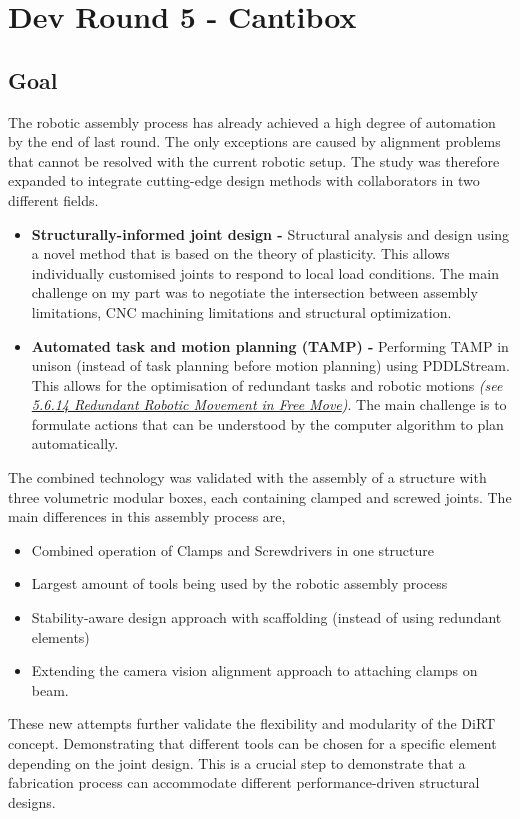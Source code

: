 \chapter{Dev Round 5 - Cantibox}

\section{Goal}

The robotic assembly process has already achieved a high degree of automation by the end of last round. The only exceptions are caused by alignment problems that cannot be resolved with the current robotic setup. The study was therefore expanded to integrate cutting-edge design methods with collaborators in two different fields. 

\begin{itemize}
	\item \textbf{Structurally-informed joint design -} Structural analysis and design using a novel method that is based on the theory of plasticity. This allows individually customised joints to respond to local load conditions. The main challenge on my part was to negotiate the intersection between assembly limitations, CNC machining limitations and structural optimization. 

	\item \textbf{Automated task and motion planning (TAMP) -} Performing TAMP in unison (instead of task planning before motion planning) using PDDLStream. This allows for the optimisation of redundant tasks and robotic motions \textit{(see \uline{5.6.14 Redundant Robotic Movement in Free Move})}. The main challenge is to formulate actions that can be understood by the computer algorithm to plan automatically. 

\end{itemize}
The combined technology was validated with the assembly of a structure with three volumetric modular boxes, each containing clamped and screwed joints. The main differences in this assembly process are,

\begin{itemize}
	\item Combined operation of Clamps and Screwdrivers in one structure

	\item Largest amount of tools being used by the robotic assembly process

	\item Stability-aware design approach with scaffolding (instead of using redundant elements)

	\item Extending the camera vision alignment approach to attaching clamps on beam.

\end{itemize}
These new attempts further validate the flexibility and modularity of the DiRT concept. Demonstrating that different tools can be chosen for a specific element depending on the joint design. This is a crucial step to demonstrate that a fabrication process can accommodate different performance-driven structural designs.  


